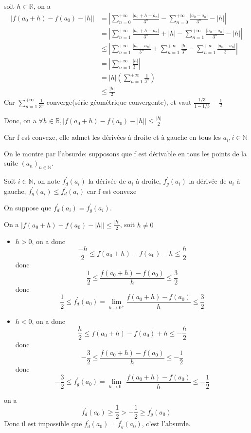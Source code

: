 \documentclass[a4paper,12pt]{book}
\begin{document}
\subsection{}
    soit $h \in \mathbb{R}$, on a 
    \begin{align*}
    \left|f(a_0+h)-f(a_0)-|h|\right|&=\left|\sum_{n=0}^{+\infty}\frac{|a_0+h-a_n|}{3^{n}}-\sum_{n=0}^{+\infty}\frac{|a_0-a_n|}{3^{n}}-|h|\right|\\
    &=\left|\sum_{n=1}^{+\infty}\frac{|a_0+h-a_n|}{3^{n}}+|h|-\sum_{n=1}^{+\infty}\frac{|a_0-a_n|}{3^{n}}-|h|\right|\\
    &\leq \left|\sum_{n=1}^{+\infty}\frac{|a_0-a_n|}{3^{n}}+\sum_{n=1}^{+\infty}\frac{|h|}{3^{n}}-\sum_{n=1}^{+\infty}\frac{|a_0-a_n|}{3^{n}}\right|\\
    &=\left|\sum_{n=1}^{+\infty}\frac{|h|}{3^{n}}\right|\\
    &=|h|\left(\sum_{n=1}^{+\infty}\frac{1}{3^{n}}\right)\\
    &\leq \frac{|h|}{2}
    \end{align*}
    Car $\sum_{n=1}^{+\infty}\frac{1}{3^{n}}$ converge(série géométrique convergente), et vaut $\frac{1/3}{1-1/3}=\frac{1}{2}$

    
Donc, on a $\boxed{\forall h \in \mathbb{R}, \left|f(a_0+h)-f(a_0)-|h|\right|\leq \frac{|h|}{2}}$

Car f est convexe, elle admet les dérivées à droite et à gauche en tous les $a_i, i \in \mathbb{N}$

On le montre par l'absurde: supposons que f est dérivable en tous les points de la suite $(a_n)_{n\in \mathbb{N}}$.

Soit $i \in \mathbb{N}$, on note $f^{'}_d(a_i)$ la dérivée de $a_i$ à droite, $f^{'}_g(a_i)$ la dérivée de $a_i$ à gauche, $f^{'}_g(a_i)\leq f^{'}_d(a_i)$ car f est convexe

On suppose que 
$f^{'}_d(a_i)=f^{'}_g(a_i)$. 

On a $\left|f(a_0+h)-f(a_0)-|h|\right| \leq \frac{|h|}{2}$, soit $h \neq 0$
\begin{itemize}
    \item $h > 0$, on a donc 
    $$
    \frac{-h}{2} \leq f(a_0+h)-f(a_0)-h\leq \frac{h}{2}
    $$
    donc 
    $$
    \frac{1}{2} \leq \frac{f(a_0+h)-f(a_0)}{h}\leq \frac{3}{2}
    $$
    donc 
    $$
    \frac{1}{2} \leq f^{'}_d(a_0)=\lim_{h\to 0^+}\frac{f(a_0+h)-f(a_0)}{h}\leq \frac{3}{2}
    $$
    \item $h < 0$, on a donc 
    $$
    \frac{h}{2} \leq f(a_0+h)-f(a_0)+h\leq -\frac{h}{2}
    $$
    donc 
    $$
    -\frac{3}{2} \leq \frac{f(a_0+h)-f(a_0)}{h}\leq -\frac{1}{2}
    $$
    donc 
    $$
    -\frac{3}{2} \leq f^{'}_g(a_0)=\lim_{h\to 0^-}\frac{f(a_0+h)-f(a_0)}{h}\leq -\frac{1}{2}
    $$
\end{itemize}
on a 
$$
  f^{'}_d(a_0) \geq \frac{1}{2} > -\frac{1}{2}\geq f^{'}_g(a_0)
$$
Donc il est impossible que $f^{'}_d(a_0)=f^{'}_g(a_0)$, c'est l'absurde. 
\end{document}
